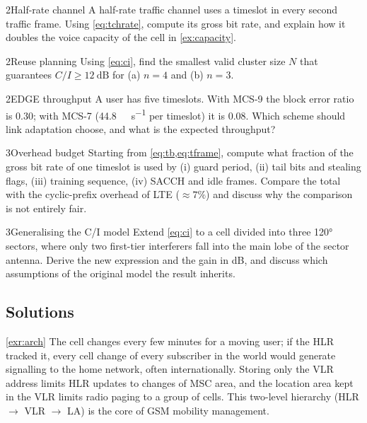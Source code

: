 \documentclass[11pt,a4paper]{article}
\begin{document}
\begin{exercisebox}{2}{Half-rate channel}\label{exr:halfrate}
A half-rate traffic channel uses a timeslot in every second traffic frame. Using
\cref{eq:tchrate}, compute its gross bit rate, and explain how it doubles the voice
capacity of the cell in \cref{ex:capacity}.
\end{exercisebox}

\begin{exercisebox}{2}{Reuse planning}\label{exr:reuse}
Using \cref{eq:ci}, find the smallest valid cluster size $N$ that guarantees
$C/I\ge\qty{12}{\dB}$ for (a) $n=4$ and (b) $n=3$.
\end{exercisebox}

\begin{exercisebox}{2}{EDGE throughput}\label{exr:edge}
A user has five timeslots. With MCS-9 the block error ratio is 0.30; with MCS-7
(\qty{44.8}{\kilo\bit\per\second} per timeslot) it is 0.08. Which scheme should link
adaptation choose, and what is the expected throughput?
\end{exercisebox}

\begin{exercisebox}{3}{Overhead budget}\label{exr:overhead}
Starting from \cref{eq:tb,eq:tframe}, compute what fraction of the gross bit rate of
one timeslot is used by (i) guard period, (ii) tail bits and stealing flags, (iii)
training sequence, (iv) SACCH and idle frames. Compare the total with the cyclic-prefix
overhead of LTE ($\approx 7\%$) and discuss why the comparison is not entirely fair.
\end{exercisebox}

\begin{exercisebox}{3}{Generalising the C/I model}\label{exr:ci3}
Extend \cref{eq:ci} to a cell divided into three \ang{120} sectors, where only two
first-tier interferers fall into the main lobe of the sector antenna. Derive the new
expression and the gain in dB, and discuss which assumptions of the original model
the result inherits.
\end{exercisebox}

\subsection*{Solutions}

\begin{solutionbox}{\ref{exr:arch}}
The cell changes every few minutes for a moving user; if the HLR tracked it, every
cell change of every subscriber in the world would generate signalling to the home
network, often internationally. Storing only the VLR address limits HLR updates to
changes of MSC area, and the location area kept in the VLR limits radio paging to a
group of cells. This two-level hierarchy (HLR $\to$ VLR $\to$ LA) is the core of GSM
mobility management.
\end{solutionbox}
\end{document}
